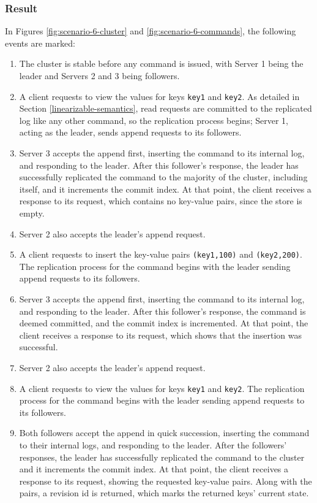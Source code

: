 \subsubsection{Result}
In Figures \ref{fig:scenario-6-cluster} and \ref{fig:scenario-6-commands}, the following events are marked:
\begin{enumerate}
    \item The cluster is stable before any command is issued, with Server 1 being the leader and Servers 2 and 3 being followers.
    \item A client requests to view the values for keys \lstinline|key1| and \lstinline|key2|. As detailed in Section \ref{linearizable-semantics}, read requests are committed to the replicated log like any other command, so the replication process begins; Server 1, acting as the leader, sends append requests to its followers.
    \item Server 3 accepts the append first, inserting the command to its internal log, and responding to the leader. After this follower's response, the leader has successfully replicated the command to the majority of the cluster, including itself, and it increments the commit index. At that point, the client receives a response to its request, which contains no key-value pairs, since the store is empty.
    \item Server 2 also accepts the leader's append request.
    \item A client requests to insert the key-value pairs \lstinline|(key1,100)| and \lstinline|(key2,200)|. The replication process for the command begins with the leader sending append requests to its followers.
    \item Server 3 accepts the append first, inserting the command to its internal log, and responding to the leader. After this follower's response, the command is deemed committed, and the commit index is incremented. At that point, the client receives a response to its request, which shows that the insertion was successful.
    \item Server 2 also accepts the leader's append request.
    \item A client requests to view the values for keys \lstinline|key1| and \lstinline|key2|. The replication process for the command begins with the leader sending append requests to its followers.
    \item Both followers accept the append in quick succession, inserting the command to their internal logs, and responding to the leader. After the followers' responses, the leader has successfully replicated the command to the cluster and it increments the commit index. At that point, the client receives a response to its request, showing the requested key-value pairs. Along with the pairs, a revision id is returned, which marks the returned keys' current state.
\end{enumerate}

